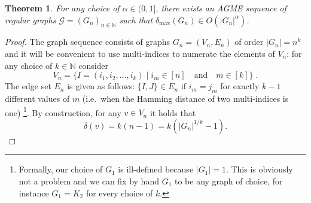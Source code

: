 \documentclass[a4paper,onecolumn,accepted=2024-12-14]{quantumarticle}
\newtheorem{theorem}{Theorem}[section]%
\theoremstyle{plain}
\newcommand{\cG}{{\mathcal G}}         %
\newcommand{\N}{\mathbb{N}} %
\newcommand{\quadtext}[1]{\quad\text{#1}\quad}
\begin{document}
\begin{theorem}\label{th:lowdegAGME}
For any choice of $\alpha\in(0,1]$, there exists an AGME sequence of regular graphs $\cG=(G_n)_{n\in\N}$
such that $\delta_{\max}(G_n)\in O(|G_n|^\alpha)$.
\end{theorem}
\begin{proof}
The graph sequence consists of graphs
$G_n=(V_n,E_n)$ of order $|G_n|=n^k$ and it will be convenient to use multi-indices to numerate the elements of $V_n$: for any choice of $k\in\mathbb{N}$ consider
\begin{equation}
V_n=\{I=(i_1,i_2,\ldots,i_k)\mid i_m\in[n]\quadtext{and} m\in[k]\}\;.
\end{equation}
The edge set $E_n$ is given as follows: $\{I,J\}\in E_n$ if $i_m=j_m$ for
exactly $k-1$ different values of $m$ (i.e.\ when the Hamming distance of two
multi-indices is one) \footnote{Formally, our choice of $G_1$ is ill-defined because $|G_1|=1$. This is obviously not a problem and we can fix by hand $G_1$ to be any graph of choice, for instance $G_1=K_2$ for every choice of $k$.}. By construction, for any $v\in V_n$ it holds that
\begin{equation}
\delta(v)=k(n-1)=k\left(|G_n|^{1/k}-1\right).
\end{equation}


\end{proof}
\end{document}
